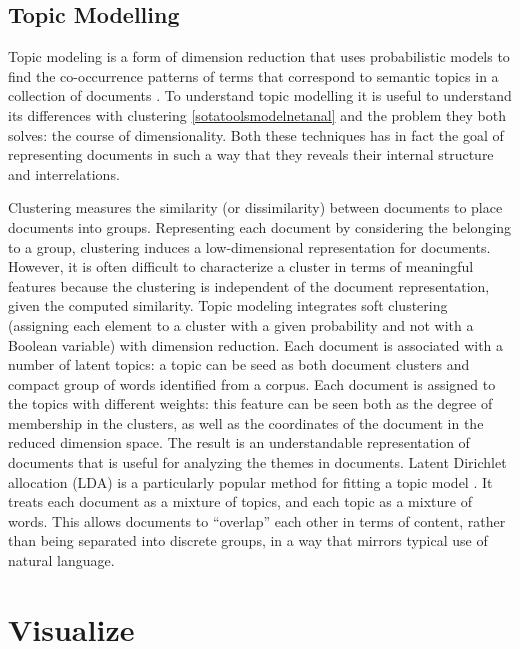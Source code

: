 \documentclass[]{book}
\theoremstyle{definition}
\theoremstyle{definition}
\theoremstyle{definition}
\theoremstyle{remark}
\begin{document}
\subsection{Topic Modelling}\label{sotatoolsmodeltopicmodel}

Topic modeling is a form of dimension reduction that uses probabilistic
models to find the co-occurrence patterns of terms that correspond to
semantic topics in a collection of documents
\citep{crain2012dimensionality}. To understand topic modelling it is
useful to understand its differences with clustering
\ref{sotatoolsmodelnetanal} and the problem they both solves: the course
of dimensionality. Both these techniques has in fact the goal of
representing documents in such a way that they reveals their internal
structure and interrelations.

Clustering measures the similarity (or dissimilarity) between documents
to place documents into groups. Representing each document by
considering the belonging to a group, clustering induces a
low-dimensional representation for documents. However, it is often
difficult to characterize a cluster in terms of meaningful features
because the clustering is independent of the document representation,
given the computed similarity. Topic modeling integrates soft clustering
(assigning each element to a cluster with a given probability and not
with a Boolean variable) with dimension reduction. Each document is
associated with a number of latent topics: a topic can be seed as both
document clusters and compact group of words identified from a corpus.
Each document is assigned to the topics with different weights: this
feature can be seen both as the degree of membership in the clusters, as
well as the coordinates of the document in the reduced dimension space.
The result is an understandable representation of documents that is
useful for analyzing the themes in documents. Latent Dirichlet
allocation (LDA) is a particularly popular method for fitting a topic
model \citep{blei2003latent}. It treats each document as a mixture of
topics, and each topic as a mixture of words. This allows documents to
``overlap'' each other in terms of content, rather than being separated
into discrete groups, in a way that mirrors typical use of natural
language.

\section{Visualize}\label{sotatoolsvisualize}
\end{document}
